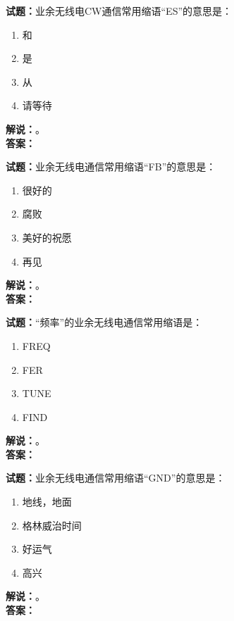 \documentclass{ctexbook}
\begin{document}
\vspace{\baselineskip}

\noindent\textbf{试题：}业余无线电CW通信常用缩语“ES”的意思是：
\begin{enumerate}[leftmargin=3em]
  \item 和
  \item 是
  \item 从
  \item 请等待
\end{enumerate}
\noindent\textbf{解说：}\textbf{}。\\\noindent\textbf{答案：}

\vspace{\baselineskip}

\noindent\textbf{试题：}业余无线电通信常用缩语“FB”的意思是：
\begin{enumerate}[leftmargin=3em]
  \item 很好的
  \item 腐败
  \item 美好的祝愿
  \item 再见
\end{enumerate}
\noindent\textbf{解说：}\textbf{}。\\\noindent\textbf{答案：}

\vspace{\baselineskip}

\noindent\textbf{试题：}“频率”的业余无线电通信常用缩语是：
\begin{enumerate}[leftmargin=3em]
  \item FREQ
  \item FER
  \item TUNE
  \item FIND
\end{enumerate}
\noindent\textbf{解说：}\textbf{}。\\\noindent\textbf{答案：}

\vspace{\baselineskip}

\noindent\textbf{试题：}业余无线电通信常用缩语“GND”的意思是：
\begin{enumerate}[leftmargin=3em]
  \item 地线，地面
  \item 格林威治时间
  \item 好运气
  \item 高兴
\end{enumerate}
\noindent\textbf{解说：}\textbf{}。\\\noindent\textbf{答案：}
\end{document}
